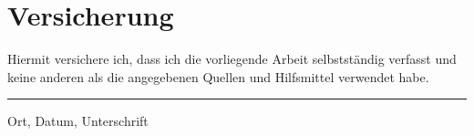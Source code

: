 
\chapter*{Versicherung}

Hiermit versichere ich, dass ich die vorliegende Arbeit selbstständig
verfasst und keine anderen als die angegebenen Quellen und Hilfsmittel
verwendet habe.

\vspace*{5ex}
\rule{12cm}{0.5pt}\newline
Ort, Datum, Unterschrift


